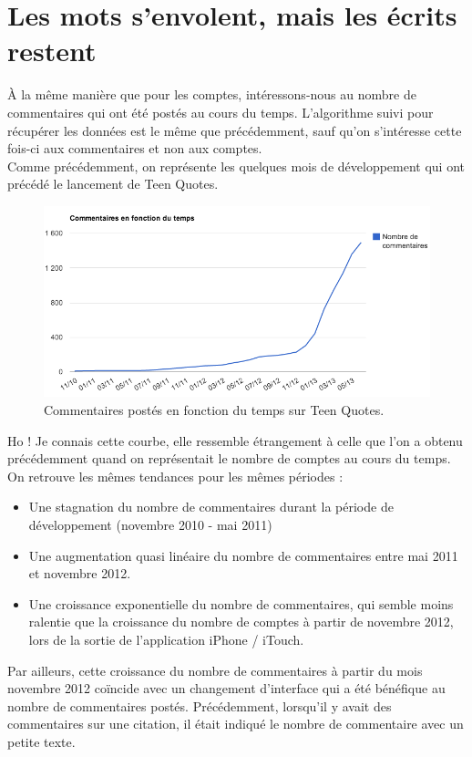 \documentclass{report}
\begin{document}
	\section{Les mots s'envolent, mais les écrits restent}
	À la même manière que pour les comptes, intéressons-nous au nombre de commentaires qui ont été postés au cours du temps. L'algorithme suivi pour récupérer les données est le même que précédemment, sauf qu'on s'intéresse cette fois-ci aux commentaires et non aux comptes.\\

	Comme précédemment, on représente les quelques mois de développement qui ont précédé le lancement de Teen Quotes.
	\begin{figure}[H]
		\center
		\includegraphics[width=450px]{images/commentairesTemps.png}
		\caption{Commentaires postés en fonction du temps sur Teen Quotes.}
	\end{figure}
	Ho ! Je connais cette courbe, elle ressemble étrangement à celle que l'on a obtenu précédemment quand on représentait le nombre de comptes au cours du temps. On retrouve les mêmes tendances pour les mêmes périodes :
	\vspace{10px}
	\begin{itemize}
		\item Une stagnation du nombre de commentaires durant la période de développement (novembre 2010 - mai 2011)
		\item Une augmentation quasi linéaire du nombre de commentaires entre mai 2011 et novembre 2012.
		\item Une croissance exponentielle du nombre de commentaires, qui semble moins ralentie que la croissance du nombre de comptes à partir de novembre 2012, lors de la sortie de l'application iPhone / iTouch.
	\end{itemize}
	\vspace{10px}
	Par ailleurs, cette croissance du nombre de commentaires à partir du mois novembre 2012 coïncide avec un changement d'interface qui a été bénéfique au nombre de commentaires postés. Précédemment, lorsqu'il y avait des commentaires sur une citation, il était indiqué le nombre de commentaire avec un petite texte.\\
\end{document}
